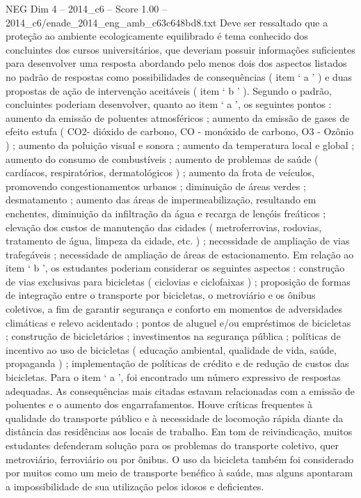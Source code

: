 \begin{textsample}{NEG Dim 4 – 2014\_c6 – Score 1.00 – 2014\_c6/enade\_2014\_eng\_amb\_c63c648bd8.txt}
Deve ser ressaltado que a proteção ao ambiente ecologicamente equilibrado é tema conhecido dos concluintes dos cursos universitários, que deveriam possuir informações suficientes para desenvolver uma resposta abordando pelo menos dois dos aspectos listados no padrão de respostas como possibilidades de consequências ( item ‘ a ’ ) e duas propostas de ação de intervenção aceitáveis ( item ‘ b ’ ).
Segundo o padrão, concluintes poderiam desenvolver, quanto ao item ‘ a ’, os seguintes pontos : aumento da emissão de poluentes atmosféricos ; aumento da emissão de gases de efeito estufa ( CO2- dióxido de carbono, CO - monóxido de carbono, O3 - Ozônio ) ; aumento da poluição visual e sonora ; aumento da temperatura local e global ; aumento do consumo de combustíveis ; aumento de problemas de saúde ( cardíacos, respiratórios, dermatológicos ) ; aumento da frota de veículos, promovendo congestionamentos urbanos ; diminuição de áreas verdes ; desmatamento ; aumento das áreas de impermeabilização, resultando em enchentes, diminuição da infiltração da água e recarga de lençóis freáticos ; elevação dos custos de manutenção das cidades ( metroferrovias, rodovias, tratamento de água, limpeza da cidade, etc. ) ; necessidade de ampliação de vias trafegáveis ; necessidade de ampliação de áreas de estacionamento.
Em relação ao item ‘ b ’, os estudantes poderiam considerar os seguintes aspectos : construção de vias exclusivas para bicicletas ( ciclovias e ciclofaixas ) ; proposição de formas de integração entre o transporte por bicicletas, o metroviário e os ônibus coletivos, a fim de garantir segurança e conforto em momentos de adversidades climáticas e relevo acidentado ; pontos de aluguel e/ou empréstimos de bicicletas ; construção de bicicletários ; investimentos na segurança pública ; políticas de incentivo ao uso de bicicletas ( educação ambiental, qualidade de vida, saúde, propaganda ) ; implementação de políticas de crédito e de redução de custos das bicicletas.
Para o item ‘ a ’, foi encontrado um número expressivo de respostas adequadas.
As consequências mais citadas estavam relacionadas com a emissão de poluentes e o aumento dos engarrafamentos.
Houve críticas frequentes à qualidade do transporte público e à necessidade de locomoção rápida diante da distância das residências aos locais de trabalho.
Em tom de reivindicação, muitos estudantes defenderam solução para os problemas do transporte coletivo, quer metroviário, ferroviário ou por ônibus.
O uso da bicicleta também foi considerado por muitos como um meio de transporte benéfico à saúde, mas alguns apontaram a impossibilidade de sua utilização pelos idosos e deficientes.

\end{textsample}

